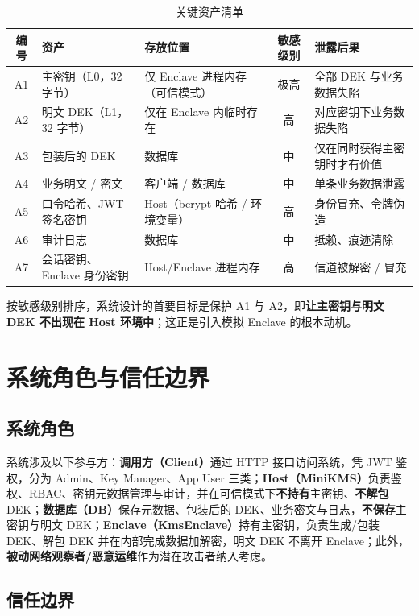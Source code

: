 \begin{table}[H]
\centering
\caption{关键资产清单}
\label{tab:assets}
\footnotesize
\begin{tabularx}{\textwidth}{c L{3.0cm} L{3.6cm} c Y}
\toprule
编号 & 资产 & 存放位置 & 敏感级别 & 泄露后果 \\
\midrule
A1 & 主密钥（L0，32 字节） & 仅 Enclave 进程内存（可信模式） & 极高 & 全部 DEK 与业务数据失陷 \\
A2 & 明文 DEK（L1，32 字节） & 仅在 Enclave 内临时存在 & 高 & 对应密钥下业务数据失陷 \\
A3 & 包装后的 DEK & 数据库 & 中 & 仅在同时获得主密钥时才有价值 \\
A4 & 业务明文 / 密文 & 客户端 / 数据库 & 中 & 单条业务数据泄露 \\
A5 & 口令哈希、JWT 签名密钥 & Host（bcrypt 哈希 / 环境变量） & 高 & 身份冒充、令牌伪造 \\
A6 & 审计日志 & 数据库 & 中 & 抵赖、痕迹清除 \\
A7 & 会话密钥、Enclave 身份密钥 & Host/Enclave 进程内存 & 高 & 信道被解密 / 冒充 \\
\bottomrule
\end{tabularx}
\end{table}

按敏感级别排序，系统设计的首要目标是保护 A1 与 A2，即\textbf{让主密钥与明文 DEK 不出现在 Host 环境中}；这正是引入模拟 Enclave 的根本动机。

\section{系统角色与信任边界}

\subsection{系统角色}

系统涉及以下参与方：\textbf{调用方（Client）}通过 HTTP 接口访问系统，凭 JWT 鉴权，分为 Admin、Key Manager、App User 三类；\textbf{Host（MiniKMS）}负责鉴权、RBAC、密钥元数据管理与审计，并在可信模式下\textbf{不持有}主密钥、\textbf{不解包} DEK；\textbf{数据库（DB）}保存元数据、包装后的 DEK、业务密文与日志，\textbf{不保存}主密钥与明文 DEK；\textbf{Enclave（KmsEnclave）}持有主密钥，负责生成/包装 DEK、解包 DEK 并在内部完成数据加解密，明文 DEK 不离开 Enclave；此外，\textbf{被动网络观察者/恶意运维}作为潜在攻击者纳入考虑。

\subsection{信任边界}

